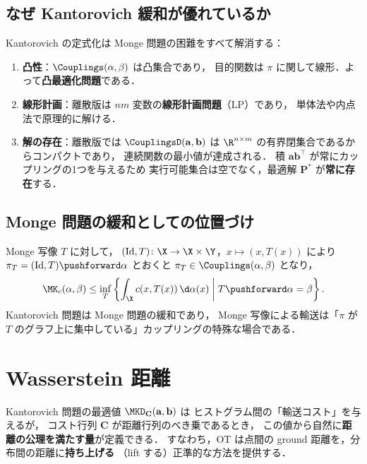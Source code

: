 \subsection{なぜ Kantorovich 緩和が優れているか}

Kantorovich の定式化は Monge 問題の困難をすべて解消する：

\begin{enumerate}
  \item \textbf{凸性}：$\Couplings(\alpha, \beta)$ は凸集合であり，
    目的関数は $\pi$ に関して線形．よって\textbf{凸最適化問題}である．
  \item \textbf{線形計画}：離散版は $nm$ 変数の\textbf{線形計画問題}（LP）であり，
    単体法や内点法で原理的に解ける．
  \item \textbf{解の存在}：離散版では $\CouplingsD(\mathbf{a}, \mathbf{b})$ は
    $\R^{n \times m}$ の有界閉集合であるからコンパクトであり，
    連続関数の最小値が達成される．
    積 $\mathbf{a}\mathbf{b}^\top$ が常にカップリングの1つを与えるため
    実行可能集合は空でなく，最適解 $\mathbf{P}^*$ が\textbf{常に存在}する．
\end{enumerate}

\subsection{Monge 問題の緩和としての位置づけ}

Monge 写像 $T$ に対して，
$(\operatorname{Id}, T) \colon \X \to \X \times \Y$，$x \mapsto (x, T(x))$
により $\pi_T = (\operatorname{Id}, T)\pushforward \alpha$ とおくと
$\pi_T \in \Couplings(\alpha, \beta)$ となり，
\[
  \MK_c(\alpha, \beta) \leq
  \inf_{T}
  \left\{
  \int_\X c(x, T(x)) \, \d\alpha(x)
  \;\middle|\;
  T\pushforward \alpha = \beta
  \right\}.
\]
Kantorovich 問題は Monge 問題の緩和であり，
Monge 写像による輸送は「$\pi$ が $T$ のグラフ上に集中している」カップリングの特殊な場合である．

\section{Wasserstein 距離}
\label{sec:sem-wasserstein}

Kantorovich 問題の最適値 $\MKD_{\mathbf{C}}(\mathbf{a}, \mathbf{b})$ は
ヒストグラム間の「輸送コスト」を与えるが，
コスト行列 $\mathbf{C}$ が距離行列のべき乗であるとき，
この値から自然に\textbf{距離の公理を満たす量}が定義できる．
すなわち，OT は点間の ground 距離を，分布間の距離に\textbf{持ち上げる}
（lift する）正準的な方法を提供する．

